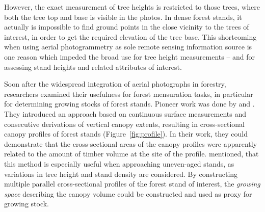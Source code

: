 However,  
the exact measurement of tree heights is restricted to those trees, where both the tree top and base is visible in the photos. 
In dense forest stands, it actually is impossible to find ground points in the close vicinity to the trees of interest, 
in order to get the required elevation of the tree base.
This shortcoming when using aerial photogrammetry as sole remote sensing information source is one reason 
which impeded the broad use for tree height measurements -- and for assessing stand heights and related attributes of interest.   

Soon after the widespread integration of aerial photographs in forestry, 
researchers examined their usefulness for forest mensuration tasks,
in particular for determining growing stocks of forest stands.
Pioneer work was done by \textcite{Hugershoff.1933} and \textcite{Neumann.1933}.
They  introduced an approach 
based on continuous surface measurements and consecutive derivations of vertical canopy extents,
resulting in cross-sectional canopy profiles of forest stands (Figure~\ref{fig:profile}). 
In their work, they could demonstrate that the cross-sectional areas of the canopy profiles were apparently related to the amount of 
timber volume at the site of the profile. \textcite{Spurr.1948} mentioned, that this method is especially useful when 
approaching uneven-aged stands, as variations in tree height and stand density are considered. 
By constructing multiple parallel cross-sectional profiles of the forest stand of interest, 
the \emph{growing space} describing the canopy volume could be constructed and used as proxy for growing stock.

